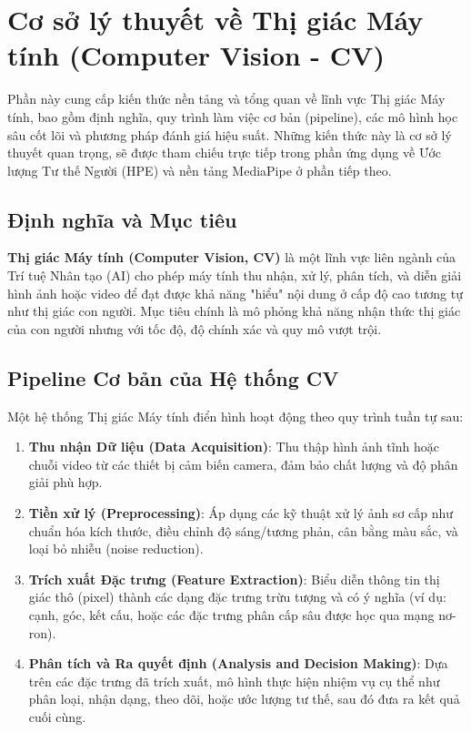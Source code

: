 \section{Cơ sở lý thuyết về Thị giác Máy tính (Computer Vision - CV)}

Phần này cung cấp kiến thức nền tảng và tổng quan về lĩnh vực Thị giác Máy tính, bao gồm định nghĩa, quy trình làm việc cơ bản (pipeline), các mô hình học sâu cốt lõi và phương pháp đánh giá hiệu suất. Những kiến thức này là cơ sở lý thuyết quan trọng, sẽ được tham chiếu trực tiếp trong phần ứng dụng về Ước lượng Tư thế Người (HPE) và nền tảng MediaPipe ở phần tiếp theo.

\subsection{Định nghĩa và Mục tiêu}
\textbf{Thị giác Máy tính (Computer Vision, CV)} là một lĩnh vực liên ngành của Trí tuệ Nhân tạo (AI) cho phép máy tính thu nhận, xử lý, phân tích, và diễn giải hình ảnh hoặc video để đạt được khả năng "hiểu" nội dung ở cấp độ cao tương tự như thị giác con người. Mục tiêu chính là mô phỏng khả năng nhận thức thị giác của con người nhưng với tốc độ, độ chính xác và quy mô vượt trội.

\subsection{Pipeline Cơ bản của Hệ thống CV}
Một hệ thống Thị giác Máy tính điển hình hoạt động theo quy trình tuần tự sau:

\begin{enumerate}
    \item \textbf{Thu nhận Dữ liệu (Data Acquisition)}: Thu thập hình ảnh tĩnh hoặc chuỗi video từ các thiết bị cảm biến camera, đảm bảo chất lượng và độ phân giải phù hợp.
    \item \textbf{Tiền xử lý (Preprocessing)}: Áp dụng các kỹ thuật xử lý ảnh sơ cấp như chuẩn hóa kích thước, điều chỉnh độ sáng/tương phản, cân bằng màu sắc, và loại bỏ nhiễu (noise reduction).
    \item \textbf{Trích xuất Đặc trưng (Feature Extraction)}: Biểu diễn thông tin thị giác thô (pixel) thành các dạng đặc trưng trừu tượng và có ý nghĩa (ví dụ: cạnh, góc, kết cấu, hoặc các đặc trưng phân cấp sâu được học qua mạng nơ-ron).
    \item \textbf{Phân tích và Ra quyết định (Analysis and Decision Making)}: Dựa trên các đặc trưng đã trích xuất, mô hình thực hiện nhiệm vụ cụ thể như phân loại, nhận dạng, theo dõi, hoặc ước lượng tư thế, sau đó đưa ra kết quả cuối cùng.
\end{enumerate}

